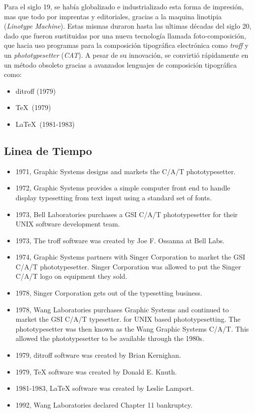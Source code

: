 \documentclass[12pt,letterpaper,titlepage,oneside,openright]{book}
\begin{document}
Para el siglo 19, se había globalizado e industrializado esta forma de impresión, mas que todo por
imprentas y editoriales, gracias a la maquina linotipia (\textit{Linotype Machine}). Estas mismas duraron hasta las ultimas décadas del siglo 20, dado que fueron sustituidas por una nueva tecnología llamada foto-composición, que hacia uso programas para la composición tipográfica electrónica como \textit{troff} y un \textit{phototypesetter} (\textit{CAT}).  A pesar de su innovación, se convirtió rápidamente en un método obsoleto gracias a avanzados lenguajes de composición tipográfica como:

\begin{itemize}
\item ditroff (1979)
\item \TeX \ (1979)
\item \LaTeX \ (1981-1983)
\end{itemize}

\subsection{Linea de Tiempo}

\begin{itemize}

\item 1971, Graphic Systems designs and markets the C/A/T phototypesetter.
\item 1972, Graphic Systems provides a simple computer front end to handle display typesetting from text input using a standard set of fonts.
\item 1973, Bell Laboratories purchases a GSI C/A/T phototypesetter for their UNIX software development team.
\item 1973, The troff software was created by Joe F. Ossanna at Bell Labs.
\item 1974, Graphic Systems partners with Singer Corporation to market the GSI C/A/T phototypesetter. Singer Corporation was allowed to put the Singer C/A/T logo on equipment they sold.
\item 1978, Singer Corporation gets out of the typesetting business.
\item 1978, Wang Laboratories purchases Graphic Systems and continued to market the GSI C/A/T typesetter. for UNIX based phototypesetting. The phototypesetter was then known as the Wang Graphic Systems C/A/T. This allowed the phototypesetter to be available through the 1980s.
\item 1979, ditroff software was created by Brian Kernighan.
\item 1979, TeX software was created by Donald E. Knuth.
\item 1981-1983, LaTeX software was created by Leslie Lamport.
\item 1992, Wang Laboratories declared Chapter 11 bankruptcy.
\end{itemize}
\end{document}
